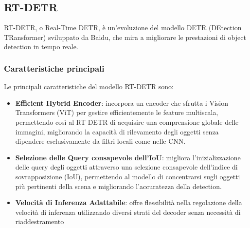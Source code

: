 \newpage

\subsection{RT-DETR}
RT-DETR, o Real-Time DETR, è un'evoluzione del modello DETR (DEtection TRansformer) sviluppato da Baidu\cite{31}, che mira a migliorare le prestazioni di object detection in tempo reale.

\subsubsection{Caratteristiche principali}
Le principali caratteristiche del modello RT-DETR sono:
\begin{itemize}
  \item \textbf{Efficient Hybrid Encoder}: incorpora un encoder che sfrutta i Vision Transformers (ViT) per gestire efficientemente le feature multiscala, permettendo così al RT-DETR di acquisire una comprensione globale delle immagini, migliorando la capacità di rilevamento degli oggetti senza dipendere esclusivamente da filtri locali come nelle CNN.
  \item \textbf{Selezione delle Query consapevole dell'IoU}: migliora l'inizializzazione delle query degli oggetti attraverso una selezione consapevole dell'indice di sovrapposizione (IoU), permettendo al modello di concentrarsi sugli oggetti più pertinenti della scena e migliorando l'accuratezza della detection.
  \item \textbf{Velocità di Inferenza Adattabile}: offre flessibilità nella regolazione della velocità di inferenza utilizzando diversi strati del decoder senza necessità di riaddestramento
\end{itemize}


